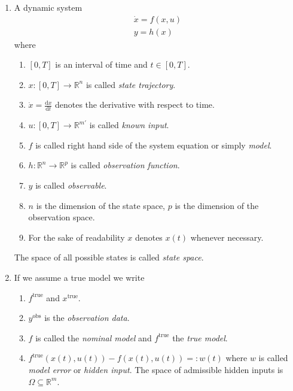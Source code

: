 



\begin{enumerate}
\item A dynamic system 
	\begin{equation}\begin{aligned}
	\dot{x} = f(x,u) \\
	y = h(x)
	\end{aligned}\end{equation}
	where
	\begin{enumerate}
	\item $[0,T]$ is an interval of time and $t\in[0,T]$. 
	\item $x:[0,T]\to \mathbb{R}^n$ is called \textit{state trajectory}.
	\item $\dot{x}=\frac{\text{d}x}{\text{d}t}$ denotes the derivative with respect to time.
	\item $u:[0,T]\to \mathbb{R}^{m'}$ is called \textit{known input}.
	\item $f$ is called right hand side of the system equation or simply \textit{model}.
	\item $h:\mathbb{R}^n\to \mathbb{R}^p$ is called \textit{observation function}.
	\item $y$ is called \textit{observable}.
	\item $n$ is the dimension of the state space, $p$ is the dimension of the observation 
		space.
	\item For the sake of readability $x$ denotes $x(t)$ whenever necessary.
	\end{enumerate}
	The space of all possible states is called \textit{state space}.
\item If we assume a true model we write 
	\begin{enumerate}
	\item	$f^\text{true}$ and $x^\text{true}$.
	\item	$y^\text{obs}$ is the \textit{observation data}.
	\item	$f$ is called the \textit{nominal model} and $f^\text{true}$ the \textit{true 
	model}.
	\item  $f^\text{true}(x(t),u(t))-f(x(t),u(t))=:w(t)$ where $w$ is called 
		\textit{model error} or \textit{hidden input}. The space of admissible hidden inputs 
		is $\Omega \subseteq \mathbb{R}^m$.
	\end{enumerate}
	

\end{enumerate}
